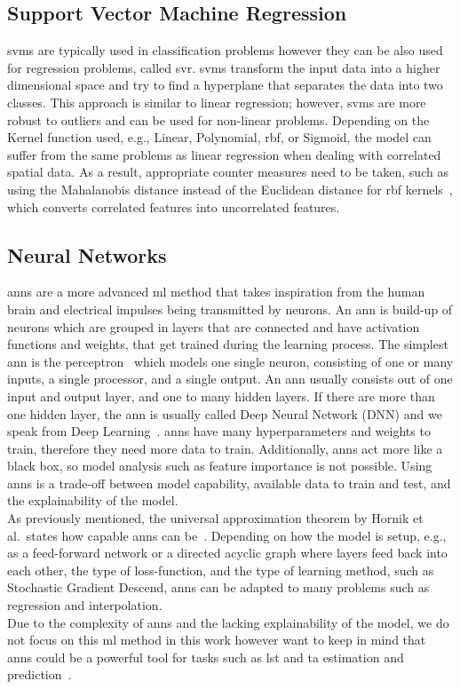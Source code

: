 \subsection{Support Vector Machine Regression}

\gls{svm}s are typically used in classification problems however they can be also used for regression problems, called \gls{svr}. \gls{svm}s transform the input data into a higher dimensional space and try to find a hyperplane that separates the data into two classes. This approach is similar to linear regression; however, \gls{svm}s are more robust to outliers and can be used for non-linear problems. Depending on the Kernel function used, e.g., Linear, Polynomial, \gls{rbf}, or Sigmoid, the model can suffer from the same problems as linear regression when dealing with correlated spatial data.
As a result, appropriate counter measures need to be taken, such as using the Mahalanobis distance instead of the Euclidean distance for \gls{rbf} kernels~\cite{kamada2006support}, which converts correlated features into uncorrelated features.

\subsection{Neural Networks}

\gls{ann}s are a more advanced \gls{ml} method that takes inspiration from the human brain and electrical impulses being transmitted by neurons. An \gls{ann} is build-up of neurons which are grouped in layers that are connected and have activation functions and weights, that get trained during the learning process. The simplest \gls{ann} is the perceptron~\cite{rosenblatt1957perceptron} which models one single neuron, consisting of one or many inputs, a single processor, and a single output. An \gls{ann} usually consists out of one input and output layer, and one to many hidden layers. If there are more than one hidden layer, the \gls{ann} is usually called Deep Neural Network (DNN) and we speak from Deep Learning~\cite{lecun2015deep}. \gls{ann}s have many hyperparameters and weights to train, therefore they need more data to train. Additionally, \gls{ann}s act more like a black box, so model analysis such as feature importance is not possible. Using \gls{ann}s is a trade-off between model capability, available data to train and test, and the explainability of the model.\\
As previously mentioned, the universal approximation theorem by Hornik et al.\ states how capable \gls{ann}s can be~\cite{hornik1989multilayer}. Depending on how the model is setup, e.g., as a feed-forward network or a directed acyclic graph where layers feed back into each other, the type of loss-function, and the type of learning method, such as Stochastic Gradient Descend, \gls{ann}s can be adapted to many problems such as regression and interpolation.\\
Due to the complexity of \gls{ann}s and the lacking explainability of the model, we do not focus on this \gls{ml} method in this work however want to keep in mind that \gls{ann}s could be a powerful tool for tasks such as \gls{lst} and \gls{ta} estimation and prediction~\cite{yuan2020deep}.
